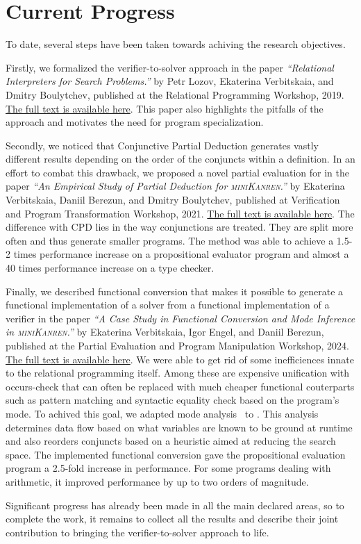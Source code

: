 \section{Current Progress}

To date, several steps have been taken towards achiving the research objectives. 

Firstly, we formalized the verifier-to-solver approach in the paper \emph{``Relational Interpreters for Search Problems.''} by Petr Lozov, Ekaterina Verbitskaia, and Dmitry Boulytchev, published at the  Relational Programming Workshop, 2019. 
\href{https://dash.harvard.edu/bitstream/handle/1/41307116/tr-02-19.pdf?sequence=1&isAllowed=y#page=47}{The full text is available here}. 
This paper also highlights the pitfalls of the approach and motivates the need for program specialization. 

Secondly, we noticed that Conjunctive Partial Deduction generates vastly different results depending on the order of the conjuncts within a definition. 
In an effort to combat this drawback, we proposed a novel partial evaluation for \mk in the paper \emph{``An Empirical Study of Partial Deduction for \textsc{miniKanren}.''} by Ekaterina Verbitskaia, Daniil Berezun, and Dmitry Boulytchev, published at  Verification and Program Transformation Workshop, 2021.
\href{https://cgi.cse.unsw.edu.au/~eptcs/paper.cgi?VPT2021.5.pdf}{The full text is available here}. 
The difference with CPD lies in the way conjunctions are treated. 
They are split more often and thus generate smaller programs. 
The method was able to achieve a 1.5-2 times performance increase on a propositional evaluator program and almost a 40 times performance increase on a type checker. 

Finally, we described functional conversion that makes it possible to generate a functional implementation of a solver from a functional implementation of a verifier in the paper  \emph{``A Case Study in Functional Conversion and Mode Inference in \textsc{miniKanren}.''} by Ekaterina Verbitskaia, Igor Engel, and Daniil Berezun, published at  the Partial Evaluation and Program Manipulation Workshop, 2024. 
\href{https://web.archive.org/web/20240111175807id_/https://dl.acm.org/doi/pdf/10.1145/3635800.3636966}{The full text is available here}.
We were able to get rid of some inefficiences innate to the relational programming itself. 
Among these are expensive unification with occurs-check that can often be replaced with much cheaper functional couterparts such as pattern matching and syntactic equality check based on the program's mode. 
To achived this goal, we adapted mode analysis~\cite{somogyi1987system,smaus2000mode} to \mk. 
This analysis determines data flow based on what variables are known to be ground at runtime and also reorders conjuncts based on a heuristic aimed at reducing the search space.
The implemented functional conversion gave the propositional evaluation program a 2.5-fold increase in performance.
For some programs dealing with arithmetic, it improved performance by up to two orders of magnitude.



Significant progress has already been made in all the main declared areas, so to complete the work, it remains to collect all the results and describe their joint contribution to bringing the verifier-to-solver approach to life. 


